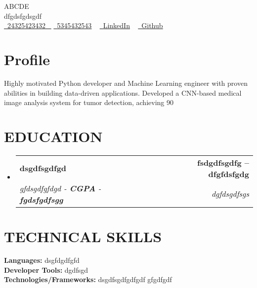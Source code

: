 \documentclass[letterpaper,11pt]{article}
\makeatletter
\newcommand{\resumeSubheading}[4]{
  \vspace{-2pt}\item
    \begin{tabular*}{1.0\textwidth}[t]{l@{\extracolsep{\fill}}r}
      \textbf{\large#1} & \textbf{\small #2} \\
      \textit{\large#3} & \textit{\small #4} \\
     
    \end{tabular*}\vspace{-7pt}
}
\newcommand{\resumeSubHeadingListStart}{\begin{itemize}[leftmargin=0.0in, label={}]}
\newcommand{\resumeSubHeadingListEnd}{\end{itemize}}
\makeatother
\begin{document}

\begin{center}
    {\Huge \scshape ABCDE} \\ \vspace{1pt}
    dfgdsfgdsgdf \\ \vspace{1pt}
    \small 
    \small \href{24325423432}{ \raisebox{-0.1\height}\faPhone\ \underline{24325423432} ~} 
    \href{5345432543}{\raisebox{-0.2\height}\faEnvelope\  \underline{5345432543}} ~
    \href{2354435342}{\raisebox{-0.2\height}\faLinkedinSquare\ \underline{LinkedIn}}  ~
    \href{345435erfdsf}{\raisebox{-0.2\height}\faGithub\ \underline{Github}} ~
\end{center}

\section{Profile}
Highly motivated Python developer and Machine Learning engineer with proven abilities in building data-driven applications. Developed a CNN-based medical image analysis system for tumor detection, achieving 90%


\section{EDUCATION}
  \resumeSubHeadingListStart
    \resumeSubheading
      {dsgdfsgdfgd}{fsdgdfsgdfg -- dfgfdsfgdg}
      {gfdsgdfgfdgd - \textbf{CGPA} - \textbf{fgdsfgdfsgg} }{dgfdsgdfsgs}
  \resumeSubHeadingListEnd
\section{TECHNICAL SKILLS}
 \begin{itemize}[leftmargin=0.15in, label={}]
    \small{\item{
     \textbf{\normalsize{Languages:}}{ \normalsize{dsgfdgdfgfd}} \\
     \textbf{\normalsize{Developer Tools:}}{ \normalsize{dgdfsgd}} \\
     \textbf{\normalsize{Technologies/Frameworks:}}{\normalsize{ dsgdfsgdfgdfgdf gfgdfgdf}} \\
    }}
 \end{itemize}
 \vspace{-15pt}
\end{document}
